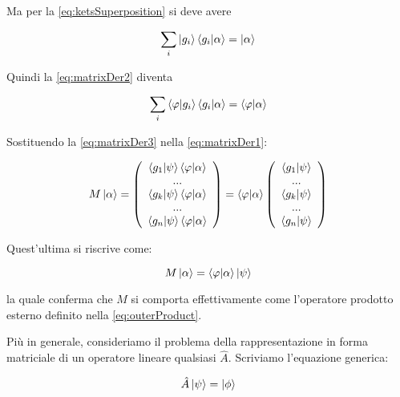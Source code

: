 Ma per la \eqref{eq:ketsSuperposition} si deve avere

	\begin{equation}
		\sum_i \ket{g_i} \braket{g_i}{\alpha} = \ket{\alpha}
	\end{equation}

Quindi la \eqref{eq:matrixDer2} diventa

	\begin{equation} \label{eq:matrixDer3}
		\sum_i \braket{\varphi}{g_i} \braket{g_i}{\alpha} = \braket{\varphi}{\alpha}
	\end{equation}

Sostituendo la \eqref{eq:matrixDer3} nella \eqref{eq:matrixDer1}:

	\begin{equation}
			M \ket{\alpha} = \left ( \begin{array}{c}
				\braket{g_1}{\psi} \braket{\varphi}{\alpha} \\
				... \\
				\braket{g_k}{\psi} \braket{\varphi}{\alpha} \\
				... \\
				\braket{g_n}{\psi} \braket{\varphi}{\alpha} \\
			\end{array}
		\right ) = \braket{\varphi}{\alpha} \left ( \begin{array}{c}
				\braket{g_1}{\psi} \\
				... \\
				\braket{g_k}{\psi} \\
				... \\
				\braket{g_n}{\psi} \\
			\end{array}
		\right )
	\end{equation}

Quest'ultima si riscrive come:

	\begin{equation}
		M \ket{\alpha} = \braket{\varphi}{\alpha} \ket{\psi}
	\end{equation}

la quale conferma che $M$ si comporta effettivamente come l'operatore prodotto esterno definito nella \eqref{eq:outerProduct}.

Più in generale, consideriamo il problema della rappresentazione in forma matriciale di un operatore lineare qualsiasi $\hat{A}$. Scriviamo l'equazione generica:

	\begin{equation} \label{eq:operatorGeneric}
		\hat{A} \ket{\psi} = \ket{\phi}
	\end{equation}

